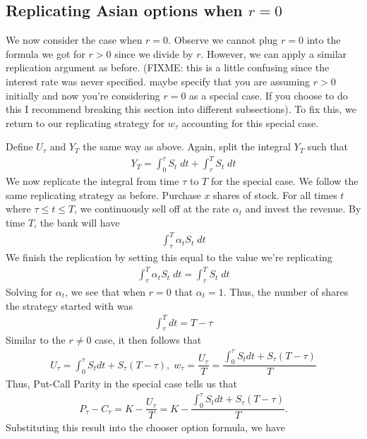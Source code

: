 \documentclass[reqno]{amsart}
\begin{document}
\subsection{Replicating Asian options when $r = 0$}
We now consider the case when $r=0$. Observe we cannot plug $r=0$ into the formula we got for $r > 0$ since we divide by $r$. However, we can apply a similar replication argument as before. (FIXME: this is a little confusing since the interest rate was never specified. maybe specify that you are assuming $r > 0$ initially and now you're considering $r = 0$ as a special case. If you choose to do this I recommend breaking this section into different subsections). To fix this, we return to our replicating strategy for $w_\tau$ accounting for this special case.

Define $U_\tau$ and $Y_T$ the same way as above. Again, split the integral $Y_T$ such that
\begin{align}
     Y_T = \int_0^\tau S_t \; dt + \int_\tau^T S_t \; dt
\end{align}
We now replicate the integral from time $\tau$ to $T$ for the special case. We follow the same replicating strategy as before. Purchase $x$ shares of stock. For all times $t$ where $\tau \leq t \leq T$, we continuously sell off at the rate $\alpha_t$ and invest the revenue. 
By time $T$, the bank will have 
\begin{align}
     \int_\tau^T \alpha_t S_t \; dt
\end{align}
We finish the replication by setting this equal to the value we're replicating
\begin{align}
     \int_\tau^T \alpha_t S_t \; dt = \int_\tau^T S_t \; dt
\end{align}
Solving for $\alpha_t$, we see that when $r = 0$ that $\alpha_t = 1$. Thus, the number of shares the strategy started with was
\begin{align}
     \int_\tau^T dt = T - \tau
\end{align}
Similar to the $r \neq 0$ case, it then follows that
\begin{align}
     U_\tau = \int_0^\tau S_t dt + S_\tau (T - \tau), \; w_\tau = \dfrac{U_\tau}{T} = \dfrac{\int_0^\tau S_t dt + S_\tau (T - \tau)}{T}
\end{align}
Thus, Put-Call Parity in the special case tells us that 
\begin{align}
     P_\tau - C_\tau = K - \dfrac{U_\tau}{T} = K - \dfrac{\int_0^\tau S_t dt + S_\tau (T - \tau)}{T}.
\end{align}
Substituting this result into the chooser option formula, we have
\end{document}
